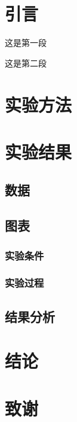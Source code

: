 \documentclass[12pt,a4paper, oneside]{ctexart}
\begin{document}
	\section{引言}
		这是第一段
		  
		这是第二段
	\section{实验方法}
	\section{实验结果}
	\subsection{数据}
	\subsection{图表}
	\subsubsection{实验条件}
	\subsubsection{实验过程}
	\subsection{结果分析}
	\section{结论}
	\section{致谢}
\end{document}
